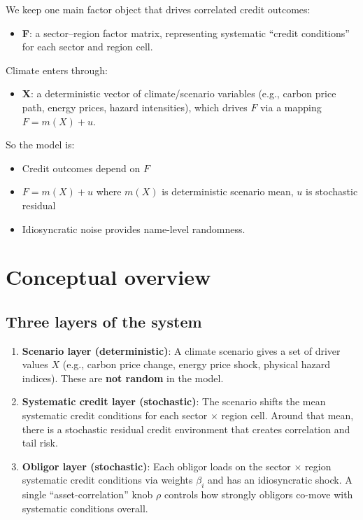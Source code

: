\documentclass[11pt,a4paper]{article}
\begin{document}
We keep one main factor object that drives correlated credit outcomes:
\begin{itemize}
    \item \textbf{F}: a sector--region factor matrix, representing systematic ``credit conditions'' for each sector and region cell.
\end{itemize}

Climate enters through:
\begin{itemize}
    \item \textbf{X}: a deterministic vector of climate/scenario variables (e.g., carbon price path, energy prices, hazard intensities), which drives $F$ via a mapping $F = m(X) + u$.
\end{itemize}

So the model is:
\begin{itemize}
    \item Credit outcomes depend on $F$
    \item $F = m(X) + u$ where $m(X)$ is deterministic scenario mean, $u$ is stochastic residual
    \item Idiosyncratic noise provides name-level randomness.
\end{itemize}

\section{Conceptual overview}

\subsection{Three layers of the system}

\begin{enumerate}
    \item \textbf{Scenario layer (deterministic)}: A climate scenario gives a set of driver values $X$ (e.g., carbon price change, energy price shock, physical hazard indices). These are \textbf{not random} in the model.

    \item \textbf{Systematic credit layer (stochastic)}: The scenario shifts the mean systematic credit conditions for each sector $\times$ region cell. Around that mean, there is a stochastic residual credit environment that creates correlation and tail risk.

    \item \textbf{Obligor layer (stochastic)}: Each obligor loads on the sector $\times$ region systematic credit conditions via weights $\beta_i$ and has an idiosyncratic shock. A single ``asset-correlation'' knob $\rho$ controls how strongly obligors co-move with systematic conditions overall.
\end{enumerate}
\end{document}
